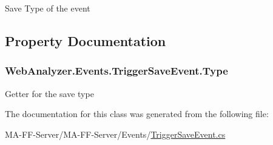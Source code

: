 Save Type of the event 



\subsection{Property Documentation}
\hypertarget{class_web_analyzer_1_1_events_1_1_trigger_save_event_af54a984dcddf28a5f41eb60d11b3d1b1}{}
\subsubsection[{Type}]{ Web\+Analyzer.\+Events.\+Trigger\+Save\+Event.\+Type\hspace{0.3cm}{\ttfamily [get]}}\label{class_web_analyzer_1_1_events_1_1_trigger_save_event_af54a984dcddf28a5f41eb60d11b3d1b1}


Getter for the save type 



The documentation for this class was generated from the following file\+:\begin{DoxyCompactItemize}
\item 
M\+A-\/\+F\+F-\/\+Server/\+M\+A-\/\+F\+F-\/\+Server/\+Events/\hyperlink{_trigger_save_event_8cs}{Trigger\+Save\+Event.\+cs}\end{DoxyCompactItemize}
